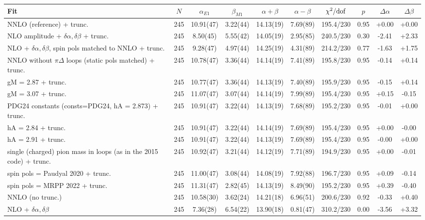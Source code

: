 \begin{tabular}{lccccccccc}
\hline
Fit & $N$ & $\alpha_{E1}$ & $\beta_{M1}$ & $\alpha+\beta$ & $\alpha-\beta$ & $\chi^2/{\rm dof}$ & $p$ & $\Delta\alpha$ & $\Delta\beta$ \\
\hline
NNLO (reference) + trunc. & 245 & 10.91(47) & 3.22(44) & 14.13(19) & 7.69(89) & 195.4/230 & 0.95 & +0.00 & +0.00 \\
NLO amplitude + $\delta\alpha,\delta\beta$ + trunc. & 245 & 8.50(45) & 5.55(42) & 14.05(19) & 2.95(85) & 240.5/230 & 0.30 & -2.41 & +2.33 \\
NLO + $\delta\alpha,\delta\beta$, spin pols matched to NNLO + trunc. & 245 & 9.28(47) & 4.97(44) & 14.25(19) & 4.31(89) & 214.2/230 & 0.77 & -1.63 & +1.75 \\
NNLO without $\pi\Delta$ loops (static pols matched) + trunc. & 245 & 10.78(47) & 3.36(44) & 14.14(19) & 7.41(89) & 195.8/230 & 0.95 & -0.14 & +0.14 \\
gM = 2.87 + trunc. & 245 & 10.77(47) & 3.36(44) & 14.13(19) & 7.40(89) & 195.9/230 & 0.95 & -0.15 & +0.14 \\
gM = 3.07 + trunc. & 245 & 11.07(47) & 3.07(44) & 14.14(19) & 7.99(89) & 195.4/230 & 0.95 & +0.15 & -0.15 \\
PDG24 constants (consts=PDG24, hA = 2.873) + trunc. & 245 & 10.91(47) & 3.22(44) & 14.13(19) & 7.68(89) & 195.2/230 & 0.95 & -0.01 & +0.00 \\
hA = 2.84 + trunc. & 245 & 10.91(47) & 3.22(44) & 14.14(19) & 7.69(89) & 195.4/230 & 0.95 & +0.00 & -0.00 \\
hA = 2.91 + trunc. & 245 & 10.91(47) & 3.22(44) & 14.13(19) & 7.69(89) & 195.4/230 & 0.95 & -0.00 & +0.00 \\
single (charged) pion mass in loops (as in the 2015 code) + trunc. & 245 & 10.92(47) & 3.21(44) & 14.12(19) & 7.71(89) & 194.9/230 & 0.95 & +0.00 & -0.01 \\
spin pols = Paudyal 2020 + trunc. & 245 & 11.00(47) & 3.08(44) & 14.08(19) & 7.92(88) & 196.7/230 & 0.95 & +0.09 & -0.14 \\
spin pols = MRPP 2022 + trunc. & 245 & 11.31(47) & 2.82(45) & 14.13(19) & 8.49(90) & 195.2/230 & 0.95 & +0.39 & -0.40 \\
NNLO (no trunc.) & 245 & 10.58(30) & 3.62(24) & 14.21(18) & 6.96(51) & 200.6/230 & 0.92 & -0.33 & +0.40 \\
NLO + $\delta\alpha,\delta\beta$ & 245 & 7.36(28) & 6.54(22) & 13.90(18) & 0.81(47) & 310.2/230 & 0.00 & -3.56 & +3.32 \\

\end{tabular}
